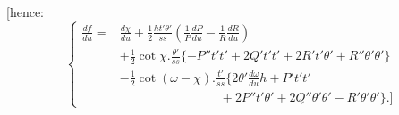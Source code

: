[hence:
\begin{equation}\tag*{[21]}
\left\{\begin{aligned}
\frac{df}{du}={}&\frac{d\chi}{du}+\tfrac12\frac{ht'\theta'}{ss}\left(\frac1P\frac{dP}{du}-\frac1R\frac{dR}{du}\right)\\
&+\tfrac12\cot\chi.\frac{\theta'}{ss}\{-P''t't'+2Q't't'+2R't'\theta'+R''\theta'\theta'\}\\
&-\tfrac12\cot(\omega-\chi).\frac{t'}{ss}\{2\theta'\frac{d\omega}{du}h+P't't'\\
&\hspace{8em}+2P''t'\theta'+2Q''\theta'\theta'-R'\theta'\theta'\}.]
\end{aligned}\right.
\end{equation}
